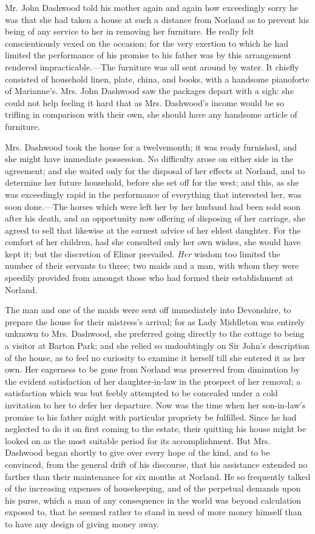 Mr. John Dashwood told his mother again and again how exceedingly sorry he was that she had taken a house at such a distance from Norland as to prevent his being of any service to her in removing her furniture. He really felt conscientiously vexed on the occasion; for the very exertion to which he had limited the performance of his promise to his father was by this arrangement rendered impracticable.---The furniture was all sent around by water. It chiefly consisted of household linen, plate, china, and books, with a handsome pianoforte of Marianne's. Mrs. John Dashwood saw the packages depart with a sigh: she could not help feeling it hard that as Mrs. Dashwood's income would be so trifling in comparison with their own, she should have any handsome article of furniture.

Mrs. Dashwood took the house for a twelvemonth; it was ready furnished, and she might have immediate possession. No difficulty arose on either side in the agreement; and she waited only for the disposal of her effects at Norland, and to determine her future household, before she set off for the west; and this, as she was exceedingly rapid in the performance of everything that interested her, was soon done.---The horses which were left her by her husband had been sold soon after his death, and an opportunity now offering of disposing of her carriage, she agreed to sell that likewise at the earnest advice of her eldest daughter. For the comfort of her children, had she consulted only her own wishes, she would have kept it; but the discretion of Elinor prevailed. {\em Her} wisdom too limited the number of their servants to three; two maids and a man, with whom they were speedily provided from amongst those who had formed their establishment at Norland.

The man and one of the maids were sent off immediately into Devonshire, to prepare the house for their mistress's arrival; for as Lady Middleton was entirely unknown to Mrs. Dashwood, she preferred going directly to the cottage to being a visitor at Barton Park; and she relied so undoubtingly on Sir John's description of the house, as to feel no curiosity to examine it herself till she entered it as her own. Her eagerness to be gone from Norland was preserved from diminution by the evident satisfaction of her daughter-in-law in the prospect of her removal; a satisfaction which was but feebly attempted to be concealed under a cold invitation to her to defer her departure. Now was the time when her son-in-law's promise to his father might with particular propriety be fulfilled. Since he had neglected to do it on first coming to the estate, their quitting his house might be looked on as the most suitable period for its accomplishment. But Mrs. Dashwood began shortly to give over every hope of the kind, and to be convinced, from the general drift of his discourse, that his assistance extended no farther than their maintenance for six months at Norland. He so frequently talked of the increasing expenses of housekeeping, and of the perpetual demands upon his purse, which a man of any consequence in the world was beyond calculation exposed to, that he seemed rather to stand in need of more money himself than to have any design of giving money away.

